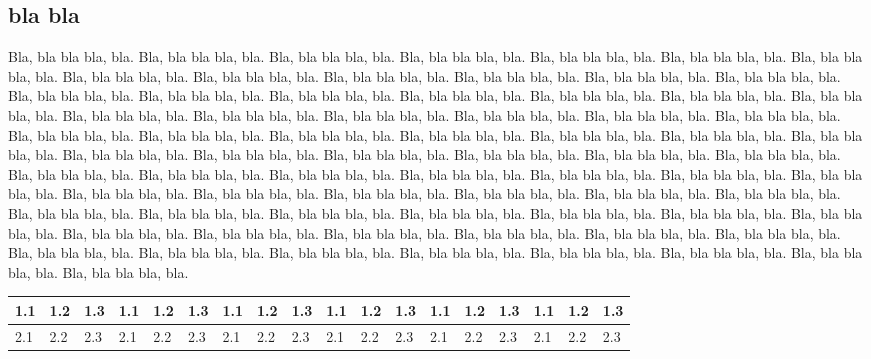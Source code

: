 \documentclass{dd}
\begin{document}
\subsection{bla bla}

Bla, bla bla bla, bla.
Bla, bla bla bla, bla.
Bla, bla bla bla, bla.
Bla, bla bla bla, bla.
Bla, bla bla bla, bla.
Bla, bla bla bla, bla.
Bla, bla bla bla, bla.
Bla, bla bla bla, bla.
Bla, bla bla bla, bla.
Bla, bla bla bla, bla.
Bla, bla bla bla, bla.
Bla, bla bla bla, bla.
Bla, bla bla bla, bla.
Bla, bla bla bla, bla.
Bla, bla bla bla, bla.
Bla, bla bla bla, bla.
Bla, bla bla bla, bla.
Bla, bla bla bla, bla.
Bla, bla bla bla, bla.
Bla, bla bla bla, bla.
Bla, bla bla bla, bla.
Bla, bla bla bla, bla.
Bla, bla bla bla, bla.
Bla, bla bla bla, bla.
Bla, bla bla bla, bla.
Bla, bla bla bla, bla.
Bla, bla bla bla, bla.
Bla, bla bla bla, bla.
Bla, bla bla bla, bla.
Bla, bla bla bla, bla.
Bla, bla bla bla, bla.
Bla, bla bla bla, bla.
Bla, bla bla bla, bla.
Bla, bla bla bla, bla.
Bla, bla bla bla, bla.
Bla, bla bla bla, bla.
Bla, bla bla bla, bla.
Bla, bla bla bla, bla.
Bla, bla bla bla, bla.
Bla, bla bla bla, bla.
Bla, bla bla bla, bla.
Bla, bla bla bla, bla.
Bla, bla bla bla, bla.
Bla, bla bla bla, bla.
Bla, bla bla bla, bla.
Bla, bla bla bla, bla.
Bla, bla bla bla, bla.
Bla, bla bla bla, bla.
Bla, bla bla bla, bla.
Bla, bla bla bla, bla.
Bla, bla bla bla, bla.
Bla, bla bla bla, bla.
Bla, bla bla bla, bla.
Bla, bla bla bla, bla.
Bla, bla bla bla, bla.
Bla, bla bla bla, bla.
Bla, bla bla bla, bla.
Bla, bla bla bla, bla.
Bla, bla bla bla, bla.
Bla, bla bla bla, bla.
Bla, bla bla bla, bla.
Bla, bla bla bla, bla.
Bla, bla bla bla, bla.
Bla, bla bla bla, bla.
Bla, bla bla bla, bla.
Bla, bla bla bla, bla.
Bla, bla bla bla, bla.
Bla, bla bla bla, bla.
Bla, bla bla bla, bla.
Bla, bla bla bla, bla.
Bla, bla bla bla, bla.
Bla, bla bla bla, bla.
Bla, bla bla bla, bla.

\begin{table*}[t]
\center
\begin{tabular}{|l|l|l|l|l|l|l|l|l|l|l|l|l|l|l|l|l|l|}
   \hline
   \rowcolor{LightCyan}
   1.1 & 1.2 & 1.3 & 1.1 & 1.2 & 1.3 & 1.1 & 1.2 & 1.3 & 1.1 & 1.2 & 1.3 & 1.1 & 1.2 & 1.3 & 1.1 & 1.2 & 1.3 \\
   \hline
   2.1 & 2.2 & 2.3 & 2.1 & 2.2 & 2.3 & 2.1 & 2.2 & 2.3 & 2.1 & 2.2 & 2.3 & 2.1 & 2.2 & 2.3 & 2.1 & 2.2 & 2.3 \\
   \hline
\end{tabular}
\end{table*}
\end{document}
